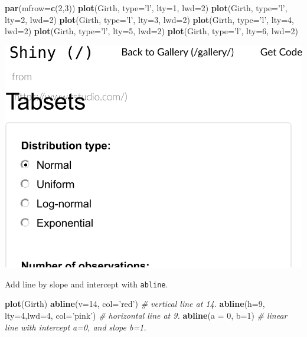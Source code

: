 \documentclass[]{book}
\newenvironment{Shaded}{\begin{snugshade}}{\end{snugshade}}
\newcommand{\CommentTok}[1]{\textcolor[rgb]{0.56,0.35,0.01}{\textit{#1}}}
\newcommand{\DataTypeTok}[1]{\textcolor[rgb]{0.13,0.29,0.53}{#1}}
\newcommand{\DecValTok}[1]{\textcolor[rgb]{0.00,0.00,0.81}{#1}}
\newcommand{\KeywordTok}[1]{\textcolor[rgb]{0.13,0.29,0.53}{\textbf{#1}}}
\newcommand{\NormalTok}[1]{#1}
\newcommand{\StringTok}[1]{\textcolor[rgb]{0.31,0.60,0.02}{#1}}
\theoremstyle{definition}
\theoremstyle{definition}
\theoremstyle{definition}
\theoremstyle{remark}
\begin{document}
\begin{Shaded}
\begin{Highlighting}[]
\KeywordTok{par}\NormalTok{(}\DataTypeTok{mfrow=}\KeywordTok{c}\NormalTok{(}\DecValTok{2}\NormalTok{,}\DecValTok{3}\NormalTok{))}
\KeywordTok{plot}\NormalTok{(Girth, }\DataTypeTok{type=}\StringTok{'l'}\NormalTok{, }\DataTypeTok{lty=}\DecValTok{1}\NormalTok{, }\DataTypeTok{lwd=}\DecValTok{2}\NormalTok{)}
\KeywordTok{plot}\NormalTok{(Girth, }\DataTypeTok{type=}\StringTok{'l'}\NormalTok{, }\DataTypeTok{lty=}\DecValTok{2}\NormalTok{, }\DataTypeTok{lwd=}\DecValTok{2}\NormalTok{)}
\KeywordTok{plot}\NormalTok{(Girth, }\DataTypeTok{type=}\StringTok{'l'}\NormalTok{, }\DataTypeTok{lty=}\DecValTok{3}\NormalTok{, }\DataTypeTok{lwd=}\DecValTok{2}\NormalTok{)}
\KeywordTok{plot}\NormalTok{(Girth, }\DataTypeTok{type=}\StringTok{'l'}\NormalTok{, }\DataTypeTok{lty=}\DecValTok{4}\NormalTok{, }\DataTypeTok{lwd=}\DecValTok{2}\NormalTok{)}
\KeywordTok{plot}\NormalTok{(Girth, }\DataTypeTok{type=}\StringTok{'l'}\NormalTok{, }\DataTypeTok{lty=}\DecValTok{5}\NormalTok{, }\DataTypeTok{lwd=}\DecValTok{2}\NormalTok{)}
\KeywordTok{plot}\NormalTok{(Girth, }\DataTypeTok{type=}\StringTok{'l'}\NormalTok{, }\DataTypeTok{lty=}\DecValTok{6}\NormalTok{, }\DataTypeTok{lwd=}\DecValTok{2}\NormalTok{)}
\end{Highlighting}
\end{Shaded}

\includegraphics[width=0.5\linewidth]{Rcourse_files/figure-latex/unnamed-chunk-266-1}

Add line by slope and intercept with \texttt{abline}.

\begin{Shaded}
\begin{Highlighting}[]
\KeywordTok{plot}\NormalTok{(Girth)}
\KeywordTok{abline}\NormalTok{(}\DataTypeTok{v=}\DecValTok{14}\NormalTok{, }\DataTypeTok{col=}\StringTok{'red'}\NormalTok{) }\CommentTok{# vertical line at 14.}
\KeywordTok{abline}\NormalTok{(}\DataTypeTok{h=}\DecValTok{9}\NormalTok{, }\DataTypeTok{lty=}\DecValTok{4}\NormalTok{,}\DataTypeTok{lwd=}\DecValTok{4}\NormalTok{, }\DataTypeTok{col=}\StringTok{'pink'}\NormalTok{) }\CommentTok{# horizontal line at 9.}
\KeywordTok{abline}\NormalTok{(}\DataTypeTok{a =} \DecValTok{0}\NormalTok{, }\DataTypeTok{b=}\DecValTok{1}\NormalTok{) }\CommentTok{# linear line with intercept a=0, and slope b=1.}
\end{Highlighting}
\end{Shaded}
\end{document}

